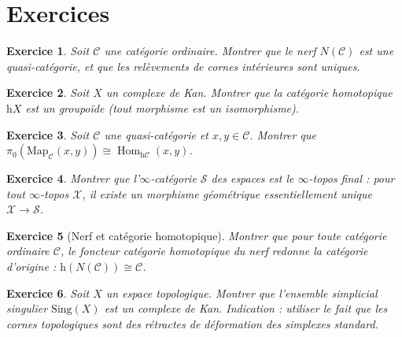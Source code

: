 \documentclass[a4paper,12pt]{book}
\DeclareMathOperator{\Hom}{Hom}
\newtheorem{exercice}{Exercice}[chapter]
\begin{document}

\section{Exercices}\label{sec:exo-infty}

\begin{exercice}\label{exo:nerf-quasi-cat}
Soit $\mathcal{C}$ une catégorie ordinaire.  Montrer que le nerf
$N(\mathcal{C})$ est une quasi-catégorie, et que les relèvements
de cornes intérieures sont \emph{uniques}.
\end{exercice}

\begin{exercice}\label{exo:kan-infty-groupoide}
Soit $X$ un complexe de Kan.  Montrer que la catégorie homotopique
$\mathrm{h}X$ est un groupoïde (tout morphisme est un isomorphisme).
\end{exercice}

\begin{exercice}\label{exo:mapping-pi0}
Soit $\mathcal{C}$ une quasi-catégorie et $x, y \in \mathcal{C}$.
Montrer que $\pi_0(\mathrm{Map}_\mathcal{C}(x,y)) \cong
\Hom_{\mathrm{h}\mathcal{C}}(x, y)$.
\end{exercice}

\begin{exercice}\label{exo:infty-topos-S}
Montrer que l'$\infty$-catégorie $\mathcal{S}$ des espaces est le
$\infty$-topos final : pour tout $\infty$-topos $\mathcal{X}$, il
existe un morphisme géométrique essentiellement unique
$\mathcal{X} \to \mathcal{S}$.
\end{exercice}

\begin{exercice}[Nerf et catégorie homotopique]\label{exo:nerf-h}
Montrer que pour toute catégorie ordinaire $\mathcal{C}$,
le foncteur catégorie homotopique du nerf redonne la catégorie
d'origine : $\mathrm{h}(N(\mathcal{C})) \cong \mathcal{C}$.
\end{exercice}

\begin{exercice}\label{exo:sing-kan}
Soit $X$ un espace topologique.  Montrer que l'ensemble simplicial
singulier $\mathrm{Sing}(X)$ est un complexe de Kan.
\textit{Indication} : utiliser le fait que les cornes topologiques
sont des rétractes de déformation des simplexes standard.
\end{exercice}
\end{document}
